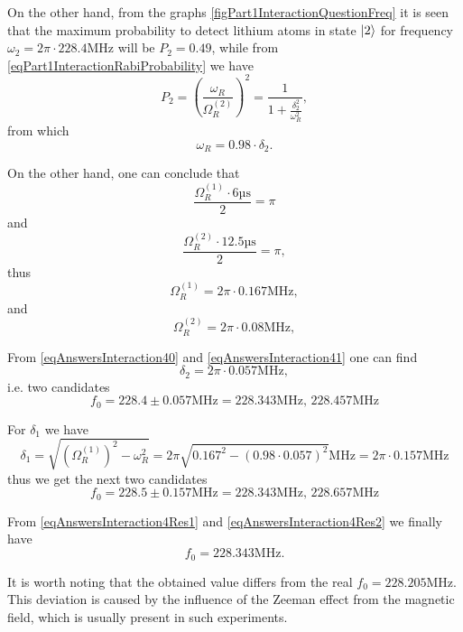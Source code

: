 On the other hand, from the graphs
\autoref{figPart1InteractionQuestionFreq} it is seen that the maximum
probability to detect lithium atoms in state $\ket{2}$ for
frequency $\omega_2 = 2 \pi \cdot 228.4 \mbox{MHz}$ will be $P_2 = 0.49$,
while from \eqref{eqPart1InteractionRabiProbability} we have
\begin{equation}
  P_2 = \left(\frac{\omega_R}{\Omega_R^{(2)}}\right)^2 =
  \frac{1}{1 + \frac{\delta_2^2}{\omega_R^2}},
  \nonumber
\end{equation}
from which
\begin{equation}
  \omega_R = 0.98 \cdot \delta_2 .
  \label{eqAnswersInteraction41}
\end{equation}

On the other hand, one can conclude that
\[
\frac{\Omega_R^{(1)} \cdot 6 \mbox{µs}}{2} = \pi
\]
and
\[
\frac{\Omega_R^{(2)} \cdot 12.5 \mbox{µs}}{2} = \pi,
\]
thus
\[
\Omega_R^{(1)} = 2 \pi \cdot 0.167 \mbox{MHz},
\]
and
\[
\Omega_R^{(2)} = 2 \pi \cdot 0.08 \mbox{MHz},
\]

From \eqref{eqAnswersInteraction40} and  \eqref{eqAnswersInteraction41}
one can find
\[
\delta_2 = 2 \pi \cdot 0.057 \mbox{MHz},
\]
i.e. two candidates
\begin{equation}
  f_0 = 228.4 \pm 0.057 \mbox{MHz} = 228.343 \mbox{MHz},\,
  228.457 \mbox{MHz} 
\label{eqAnswersInteraction4Res1}
\end{equation}

For $\delta_1$ we have
\[
\delta_1 = \sqrt{\left(\Omega_R^{(1)}\right)^2 - \omega_R^2} =
2 \pi \sqrt{0.167^2 - (0.98 \cdot 0.057)^2} \mbox{MHz} =
2 \pi \cdot 0.157 \mbox{MHz}
\]
thus we get the next two candidates
\begin{equation}
  f_0 = 228.5 \pm 0.157 \mbox{MHz} = 228.343 \mbox{MHz},\,
  228.657 \mbox{MHz} 
\label{eqAnswersInteraction4Res2}
\end{equation}

From \eqref{eqAnswersInteraction4Res1} and
\eqref{eqAnswersInteraction4Res2} we finally have
\[
f_0 = 228.343 \mbox{MHz}.
\]

It is worth noting that the obtained value differs from the real $f_0 =
228.205 \mbox{MHz}$. This deviation is caused by the influence of the Zeeman effect from
the magnetic field, which is usually present in such experiments.



